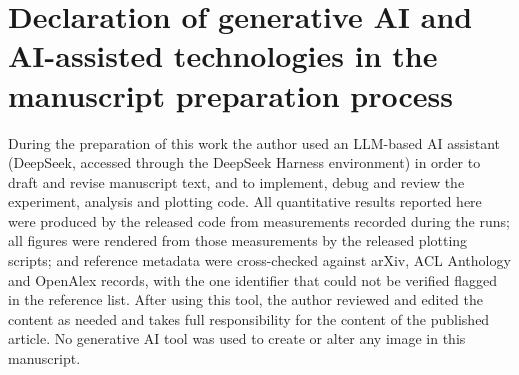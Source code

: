 \documentclass[review,12pt]{elsarticle}
\begin{document}
\section*{Declaration of generative AI and AI-assisted technologies in the manuscript preparation process}
During the preparation of this work the author used an LLM-based AI assistant
(DeepSeek, accessed through the DeepSeek Harness environment) in order to draft
and revise manuscript text, and to implement, debug and review the experiment,
analysis and plotting code. All quantitative results reported here were
produced by the released code from measurements recorded during the runs; all
figures were rendered from those measurements by the released plotting
scripts; and reference metadata were cross-checked against arXiv, ACL
Anthology and OpenAlex records, with the one identifier that could not be
verified flagged in the reference list. After using this tool, the author
reviewed and edited the content as needed and takes full responsibility for the
content of the published article. No generative AI tool was used to create or
alter any image in this manuscript.
\end{document}
